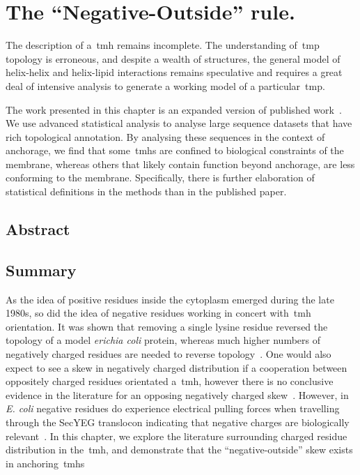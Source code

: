 \chapter{The ``Negative-Outside'' rule.}
\sloppy
The description of a~\gls{tmh} remains incomplete.
The understanding of~\gls{tmp} topology is erroneous, and despite a wealth of structures, the general model of helix-helix and helix-lipid interactions remains speculative and requires a great deal of intensive analysis to generate a working model of a particular~\gls{tmp}.

The work presented in this chapter is an expanded version of published work~\cite{Baker2017}.
We use advanced statistical analysis to analyse large sequence datasets that have rich topological annotation.
By analysing these sequences in the context of anchorage, we find that some~\gls{tmh}s are confined to biological constraints of the membrane, whereas others that likely contain function beyond anchorage, are less conforming to the membrane.
Specifically, there is further elaboration of statistical definitions in the methods than in the published paper.

\section{Abstract}

\section{Summary}
As the idea of positive residues inside the cytoplasm emerged during the late 1980s, so did the idea of negative residues working in concert with~\gls{tmh} orientation.
It was shown that removing a single lysine residue reversed the topology of a model \textit{erichia coli} protein, whereas much higher numbers of negatively charged residues are needed to reverse topology~\cite{Nilsson1990}.
One would also expect to see a skew in negatively charged distribution if a cooperation between oppositely charged residues orientated a~\gls{tmh}, however there is no conclusive evidence in the literature for an opposing negatively charged skew~\cite{Granseth2005, Nilsson2005a, Sharpe2010, Baeza-Delgado2013, Pogozheva2013}.
However, in \textit{E.
coli} negative residues do experience electrical pulling forces when travelling through the SecYEG translocon indicating that negative charges are biologically relevant~\cite{Ismail2015}.
In this chapter, we explore the literature surrounding charged residue distribution in the~\gls{tmh}, and demonstrate that the ``negative-outside'' skew exists in anchoring~\gls{tmh}s

